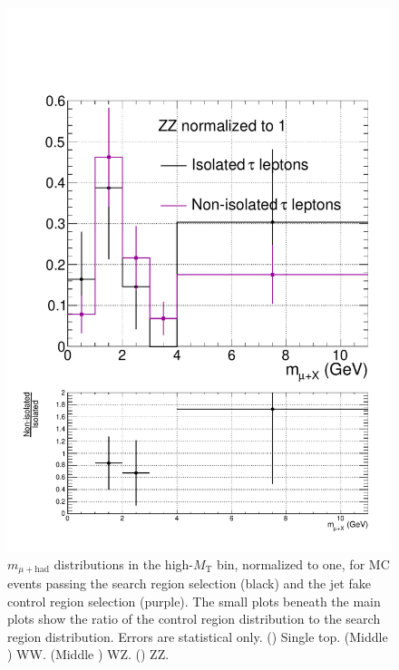 \begin{figure}[hbtp]
\begin{center}
    \includegraphics[width=0.6\cmsFigWidth]{figures/isoVsNonIsoTaus_ZZ_highMT_v87}
    \caption{$m_{\mu+\text{had}}$ distributions in the high-$M_{\text{T}}$ bin, normalized to one, for MC events passing the search region selection (black) and the jet fake control region selection (purple).  The small plots beneath the main plots show the ratio of the control region distribution to the search region distribution.  Errors are statistical only.  (\cmsLeft) Single top.  (Middle \cmsLeft) WW.  (Middle \cmsRight) WZ.  (\cmsRight) ZZ.}
    \label{fig:MC-regA-vs-regB-secondary-highMT}
  \end{center}
\end{figure}

